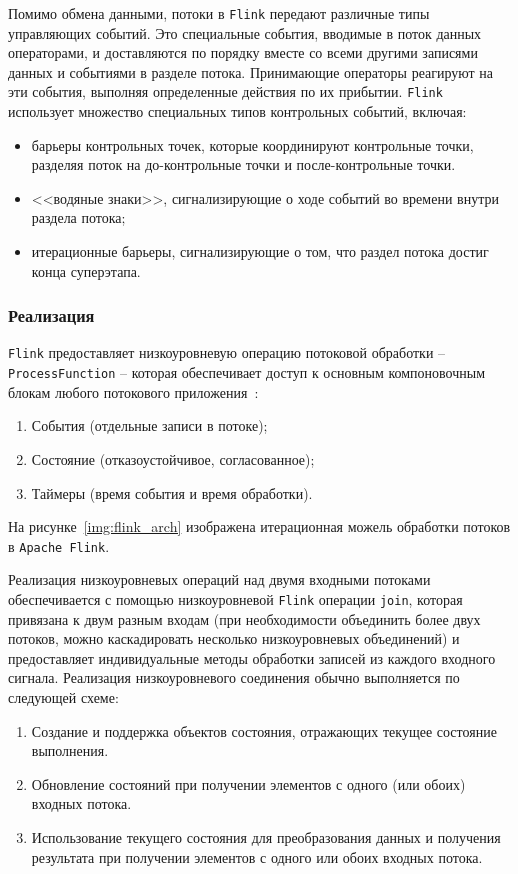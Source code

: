 \begin{enumerate}
    Помимо обмена данными, потоки в \texttt{Flink} передают различные типы управляющих событий. 
    Это специальные события, вводимые в поток данных операторами, и доставляются по порядку вместе со всеми другими записями данных и событиями в разделе потока. 
    Принимающие операторы реагируют на эти события, выполняя определенные действия по их прибытии. 
    \texttt{Flink} использует множество специальных типов контрольных событий, включая:
    \begin{itemize}
      \item барьеры контрольных точек, которые координируют контрольные точки, разделяя поток на до-контрольные точки и после-контрольные точки.
      \item <<водяные знаки>>, сигнализирующие о ходе событий во времени внутри раздела потока;
      \item итерационные барьеры, сигнализирующие о том, что раздел потока достиг конца суперэтапа.
    \end{itemize}
\end{enumerate}

\subsubsection{Реализация}

\texttt{Flink} предоставляет низкоуровневую операцию потоковой обработки -- \texttt{ProcessFunction} -- которая обеспечивает доступ к основным компоновочным блокам любого потокового приложения~\cite{flink-oreilly}:
\begin{enumerate}
  \item События (отдельные записи в потоке);
  \item Состояние (отказоустойчивое, согласованное);
  \item Таймеры (время события и время обработки).
\end{enumerate}

На рисунке~\ref{img:flink_arch} изображена итерационная можель обработки потоков в \texttt{Apache Flink}.

Реализация низкоуровневых операций над двумя входными потоками обеспечивается с помощью низкоуровневой \texttt{Flink} операции \texttt{join}, которая привязана к двум разным входам (при необходимости объединить более двух потоков, можно каскадировать несколько низкоуровневых объединений) и предоставляет индивидуальные методы обработки записей из каждого входного сигнала. 
Реализация низкоуровневого соединения обычно выполняется по следующей схеме:
\begin{enumerate}
  \item Создание и поддержка объектов состояния, отражающих текущее состояние выполнения.
  \item Обновление состояний при получении элементов с одного (или обоих) входных потока.
  \item Использование текущего состояния для преобразования данных и получения результата при получении элементов с одного или обоих входных потока.
\end{enumerate}

